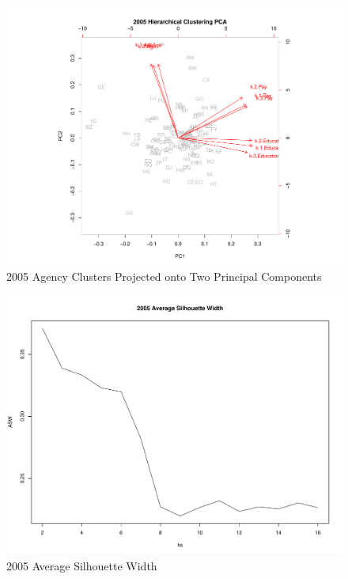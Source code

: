 \documentclass{article}
\begin{document}
    \begin{center}
        \begin{figure}
            \includegraphics[scale=0.4]{./images/2005-pca.pdf}
            \caption{2005 Agency Clusters Projected onto Two Principal Components}
            \label{fig:6}
        \end{figure}
    \end{center}

    \begin{center}
        \begin{figure}
            \includegraphics[scale=0.4]{./images/2005-sil-width.pdf}
            \caption{2005 Average Silhouette Width}
            \label{fig:7}
        \end{figure}
    \end{center}
\end{document}
